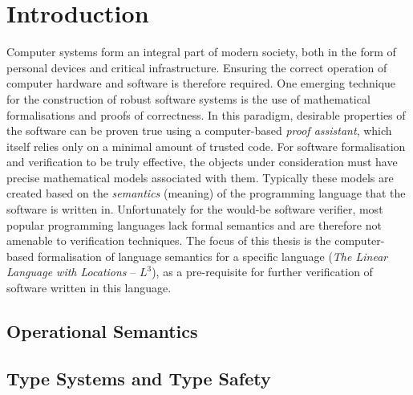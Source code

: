 \documentclass[]{unswthesis}
\begin{document}
\frontmatter  
\maketitle

% 
% 
% 

\tableofcontents

\mainmatter

% 
\chapter{Introduction}
\label{ch:intro}

Computer systems form an integral part of modern society, both in the form of personal devices and critical infrastructure. Ensuring the correct operation of computer hardware and software is therefore required. One emerging technique for the construction of robust software systems is the use of mathematical formalisations and proofs of correctness. In this paradigm, desirable properties of the software can be proven true using a computer-based \textit{proof assistant}, which itself relies only on a minimal amount of trusted code. For software formalisation and verification to be truly effective, the objects under consideration must have precise mathematical models associated with them. Typically these models are created based on the \textit{semantics} (meaning) of the programming language that the software is written in. Unfortunately for the would-be software verifier, most popular programming languages lack formal semantics and are therefore not amenable to verification techniques. The focus of this thesis is the computer-based formalisation of language semantics for a specific language (\textit{The Linear Language with Locations} -- $L^3$), as a pre-requisite for further verification of software written in this language.

\section{Operational Semantics}

\section{Type Systems and Type Safety}
\end{document}
